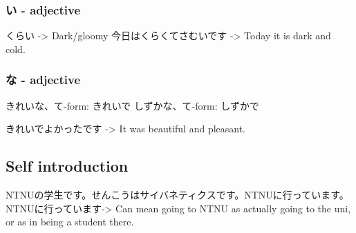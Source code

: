 \subsubsection{い - adjective}
くらい -> Dark/gloomy
今日はくらくてさむいです -> Today it is dark and cold.

\subsubsection{な - adjective}
きれいな、て-form: きれいで
しずかな、て-form: しずかで

きれいでよかったです -> It was beautiful and pleasant.

\subsection{Self introduction}
NTNUの学生です。せんこうはサイバネティクスです。NTNUに行っています。
NTNUに行っています-> Can mean going to NTNU as actually going to the uni, or as in being a student there.





